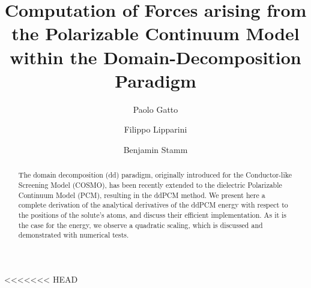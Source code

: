 \documentclass[aip,jcp,a4paper,11pt]{revtex4-1}
\begin{document}
\title{Computation of Forces arising from the Polarizable Continuum Model within the Domain-Decomposition Paradigm}

\author{Paolo Gatto}

\author{Filippo Lipparini}

\author{Benjamin Stamm}



\begin{abstract}
The domain decomposition (dd) paradigm, originally introduced for the Conductor-like Screening Model (COSMO), has been recently extended to the dielectric Polarizable Continuum Model (PCM), resulting in the ddPCM method. We present here a complete derivation of the analytical derivatives of the ddPCM energy with respect to the positions of the solute's atoms, and discuss their efficient implementation. As it is the case for the energy, we observe a quadratic scaling, which is discussed and demonstrated with numerical tests.  

\end{abstract}

\maketitle
<<<<<<< HEAD
\end{document}
